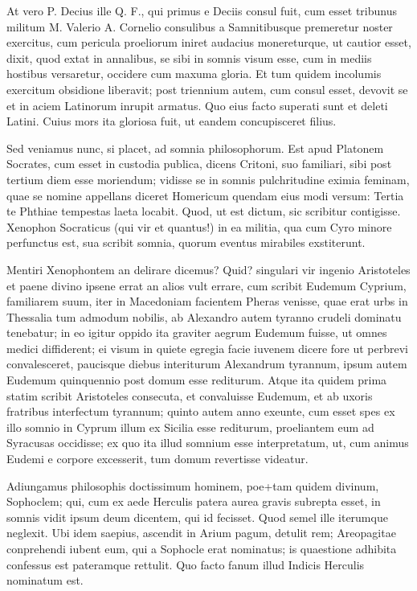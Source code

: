  At vero P. Decius ille Q. F., qui primus e Deciis consul fuit, cum esset tribunus militum M. Valerio A. Cornelio consulibus a Samnitibusque premeretur noster exercitus, cum pericula proeliorum iniret audacius monereturque, ut cautior esset, dixit, quod extat in annalibus, se sibi in somnis visum esse, cum in mediis hostibus versaretur, occidere cum maxuma gloria. Et tum quidem incolumis exercitum obsidione liberavit; post triennium autem, cum consul esset, devovit se et in aciem Latinorum inrupit armatus. Quo eius facto superati sunt et deleti Latini. Cuius mors ita gloriosa fuit, ut eandem concupisceret filius.

 Sed veniamus nunc, si placet, ad somnia philosophorum. Est apud Platonem Socrates, cum esset in custodia publica, dicens Critoni, suo familiari, sibi post tertium diem esse moriendum; vidisse se in somnis pulchritudine eximia feminam, quae se nomine appellans diceret Homericum quendam eius modi versum: Tertia te Phthiae tempestas laeta locabit. Quod, ut est dictum, sic scribitur contigisse. Xenophon Socraticus (qui vir et quantus!) in ea militia, qua cum Cyro minore perfunctus est, sua scribit somnia, quorum eventus mirabiles exstiterunt.

 Mentiri Xenophontem an delirare dicemus? Quid? singulari vir ingenio Aristoteles et paene divino ipsene errat an alios vult errare, cum scribit Eudemum Cyprium, familiarem suum, iter in Macedoniam facientem Pheras venisse, quae erat urbs in Thessalia tum admodum nobilis, ab Alexandro autem tyranno crudeli dominatu tenebatur; in eo igitur oppido ita graviter aegrum Eudemum fuisse, ut omnes medici diffiderent; ei visum in quiete egregia facie iuvenem dicere fore ut perbrevi convalesceret, paucisque diebus interiturum Alexandrum tyrannum, ipsum autem Eudemum quinquennio post domum esse rediturum. Atque ita quidem prima statim scribit Aristoteles consecuta, et convaluisse Eudemum, et ab uxoris fratribus interfectum tyrannum; quinto autem anno exeunte, cum esset spes ex illo somnio in Cyprum illum ex Sicilia esse rediturum, proeliantem eum ad Syracusas occidisse; ex quo ita illud somnium esse interpretatum, ut, cum animus Eudemi e corpore excesserit, tum domum revertisse videatur.

 Adiungamus philosophis doctissimum hominem, poe+tam quidem divinum, Sophoclem; qui, cum ex aede Herculis patera aurea gravis subrepta esset, in somnis vidit ipsum deum dicentem, qui id fecisset. Quod semel ille iterumque neglexit. Ubi idem saepius, ascendit in Arium pagum, detulit rem; Areopagitae conprehendi iubent eum, qui a Sophocle erat nominatus; is quaestione adhibita confessus est pateramque rettulit. Quo facto fanum illud Indicis Herculis nominatum est.

